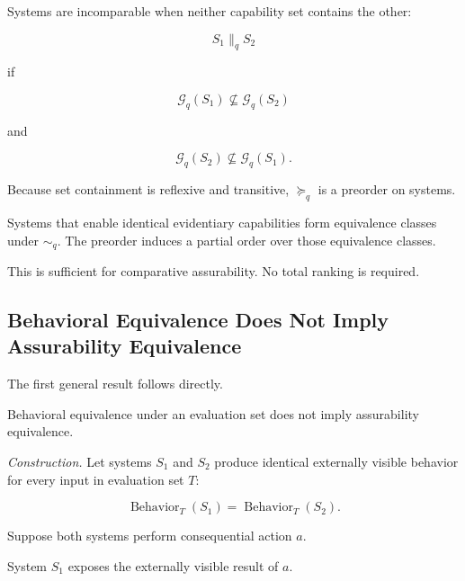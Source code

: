 Systems are incomparable when neither capability set contains the other:

\begin{equation}
  S_1 \parallel_q S_2
\end{equation}

if

\begin{equation}
  \mathcal{G}_q(S_1)
  \nsubseteq
  \mathcal{G}_q(S_2)
\end{equation}

and

\begin{equation}
  \mathcal{G}_q(S_2)
  \nsubseteq
  \mathcal{G}_q(S_1).
  \label{eq:assurability-incomparability}
\end{equation}

Because set containment is reflexive and transitive, \(\succeq_q\) is a preorder on systems.

Systems that enable identical evidentiary capabilities form equivalence classes under \(\sim_q\).
The preorder induces a partial order over those equivalence classes.

This is sufficient for comparative assurability.
No total ranking is required.

\subsection{Behavioral Equivalence Does Not Imply Assurability Equivalence}
\label{aa.subsec.behavior-not-assurability}

The first general result follows directly.

\begin{proposition}
  \label{se320.prop.BehavioralNonImplication}
  Behavioral equivalence under an evaluation set does not imply assurability equivalence.
\end{proposition}

\textit{Construction.}
Let systems \(S_1\) and \(S_2\) produce identical externally visible behavior for every input in evaluation set \(T\):

\begin{equation}
  \operatorname{Behavior}_T(S_1)
  =
  \operatorname{Behavior}_T(S_2).
\end{equation}

Suppose both systems perform consequential action \(a\).

System \(S_1\) exposes the externally visible result of \(a\).

